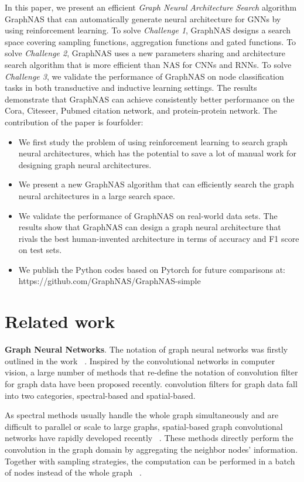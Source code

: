 \documentclass{article}
\begin{document}
In this paper, we present an efficient \textit{Graph Neural Architecture Search} algorithm GraphNAS that can automatically generate neural architecture for GNNs by using reinforcement learning. To solve \textit{Challenge 1}, GraphNAS designs a search space covering sampling functions, aggregation functions and gated functions. To solve \textit{Challenge 2}, GraphNAS uses a new parameters sharing and architecture search algorithm that is more efficient than NAS for CNNs and RNNs. To solve \textit{Challenge 3}, we validate the performance of GraphNAS on node classification tasks in both transductive and inductive learning settings. The results demonstrate that GraphNAS can achieve consistently better performance on the Cora, Citeseer, Pubmed citation network, and protein-protein network. The contribution of the paper is fourfolder: 
\begin{itemize}
	\item We first study the problem of using reinforcement learning to search graph neural architectures, which has the potential to save a lot of manual work for designing graph neural architectures. 
	\item We present a new GraphNAS algorithm that can efficiently search the graph neural architectures in a large search space. 
	\item We validate the performance of GraphNAS on real-world data sets. The results show that GraphNAS can design a graph neural architecture that rivals the best human-invented architecture in terms of accuracy and F1 score on test sets.
	\item We publish the Python codes based on Pytorch for future comparisons at: 
	https://github.com/GraphNAS/GraphNAS-simple
\end{itemize}


\section{Related work}

\textbf{Graph Neural Networks}. The notation of graph neural networks was firstly outlined in the work ~\cite{Gori2005A}. Inspired by the convolutional networks in computer vision, a large number of methods that re-define the notation of convolution filter for graph data have been proposed recently. convolution filters for graph data fall into two categories, spectral-based and spatial-based. 

As spectral methods usually handle the whole graph simultaneously and are difficult to parallel or scale to large graphs, spatial-based graph convolutional networks have rapidly developed recently ~\cite{GraphSAGE,Monti2017GeometricDL,Niepert2016LearningCN,Gao2018LargeScaleLG,GAT}. These methods directly perform the convolution in the graph domain by aggregating the neighbor nodes’ information. Together with sampling strategies, the computation can be performed in a batch of nodes instead of the whole graph ~\cite{GraphSAGE,Gao2018LargeScaleLG}.
\end{document}
